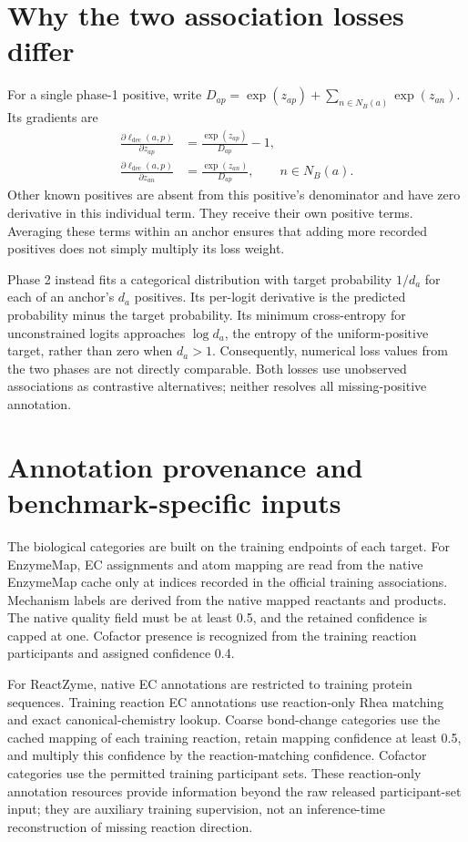 \section{Why the two association losses differ}
\label{app:v4-loss-behavior}
For a single phase-1 positive, write
$D_{ap}=\exp(z_{ap})+\sum_{n\in N_B(a)}\exp(z_{an})$. Its gradients are
\begin{align}
  \frac{\partial\ell_{\mathrm{dec}}(a,p)}{\partial z_{ap}}
      &=\frac{\exp(z_{ap})}{D_{ap}}-1,\\
  \frac{\partial\ell_{\mathrm{dec}}(a,p)}{\partial z_{an}}
      &=\frac{\exp(z_{an})}{D_{ap}},\qquad n\in N_B(a).
\end{align}
Other known positives are absent from this positive's denominator and have
zero derivative in this individual term. They receive their own positive
terms. Averaging these terms within an anchor ensures that adding more
recorded positives does not simply multiply its loss weight.

Phase 2 instead fits a categorical distribution with target probability
$1/d_a$ for each of an anchor's $d_a$ positives. Its per-logit derivative is
the predicted probability minus the target probability. Its minimum
cross-entropy for unconstrained logits approaches $\log d_a$, the entropy
of the uniform-positive target, rather than zero when $d_a>1$.
Consequently, numerical loss values from the two phases are not directly
comparable. Both losses use unobserved associations as contrastive
alternatives; neither resolves all missing-positive annotation.

\section{Annotation provenance and benchmark-specific inputs}
\label{app:v4-annotations}
The biological categories are built on the training endpoints of each target.
For EnzymeMap, EC assignments and atom mapping are read from the native
EnzymeMap cache only at indices recorded in the official training
associations. Mechanism labels are derived from the native mapped reactants
and products. The native quality field must be at least 0.5, and the retained
confidence is capped at one. Cofactor presence is recognized from the
training reaction participants and assigned confidence 0.4.

For ReactZyme, native EC annotations are restricted to training protein
sequences. Training reaction EC annotations use reaction-only Rhea matching
and exact canonical-chemistry lookup. Coarse bond-change categories use
the cached mapping of each training reaction, retain mapping confidence at
least 0.5, and multiply this confidence by the reaction-matching confidence.
Cofactor categories use the permitted training participant sets. These
reaction-only annotation resources provide information beyond the raw
released participant-set input; they are auxiliary training supervision,
not an inference-time reconstruction of missing reaction direction.


